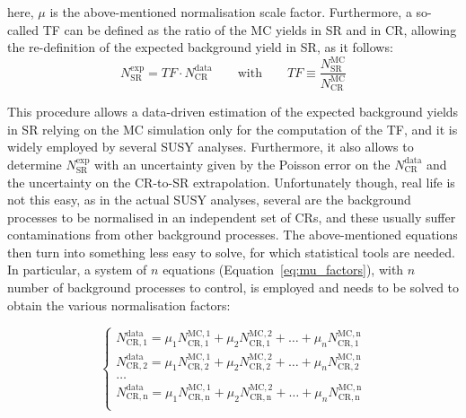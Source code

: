 		\noindent here, $\mu$ is the above-mentioned normalisation scale factor. Furthermore, a so-called \ac{TF} can be defined as the ratio of the \ac{MC} yields in \ac{SR} and in \ac{CR}, allowing the re-definition of the expected background yield in \ac{SR}, as it follows: 
		\begin{equation}
			N_{\mathrm{SR}}^{\mathrm{exp}} = TF \cdot N_{\mathrm{CR}}^{\mathrm{data}} \qquad \mathrm{with} \qquad TF \equiv \frac{N_{\mathrm{SR}}^{\mathrm{MC}}}{N_{\mathrm{CR}}^{\mathrm{MC}}}
		\label{eq:tf}
		\end{equation}

		\noindent This procedure allows a data-driven estimation of the expected background yields in \ac{SR} relying on the \ac{MC} simulation only for the computation of the \ac{TF}, and it is widely employed by several \ac{SUSY} analyses. Furthermore, it also allows to determine $N_{\mathrm{SR}}^{\mathrm{exp}}$ with an uncertainty given by the Poisson error on the $N_{\mathrm{CR}}^{\mathrm{data}}$ and the uncertainty on the \ac{CR}-to-\ac{SR} extrapolation. Unfortunately though, real life is not this easy, as in the actual \ac{SUSY} analyses, several are the background processes to be normalised in an independent set of \acp{CR}, and these usually suffer contaminations from other background processes. The above-mentioned equations then turn into something less easy to solve, for which statistical tools are needed. In particular, a system of $n$ equations (Equation~\ref{eq:mu_factors}), with $n$ number of background processes to control, is employed and needs to be solved to obtain the various normalisation factors:

		\begin{equation}
			\begin{cases}
				N_{\mathrm{CR,1}}^{\mathrm{data}} = \mu_1 N_{\mathrm{CR,1}}^{\mathrm{MC,1}} + \mu_2 N_{\mathrm{CR,1}}^{\mathrm{MC,2}} + \dots + \mu_n N_{\mathrm{CR,1}}^{\mathrm{MC,n}} \\
				N_{\mathrm{CR,2}}^{\mathrm{data}} = \mu_1 N_{\mathrm{CR,2}}^{\mathrm{MC,1}} + \mu_2 N_{\mathrm{CR,2}}^{\mathrm{MC,2}} + \dots + \mu_n N_{\mathrm{CR,2}}^{\mathrm{MC,n}} \\
				\dots \\
				N_{\mathrm{CR,n}}^{\mathrm{data}} = \mu_1 N_{\mathrm{CR,n}}^{\mathrm{MC,1}} + \mu_2 N_{\mathrm{CR,n}}^{\mathrm{MC,2}} + \dots + \mu_n N_{\mathrm{CR,n}}^{\mathrm{MC,n}} \\
			\end{cases}
		\label{eq:mu_factors}
		\end{equation}

